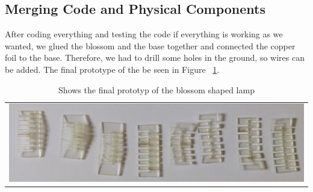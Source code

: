 \documentclass[00_doc.tex]{subfiles}
\begin{document}
    \subsection{Merging Code and Physical Components}
    \begin{flushleft}
        After coding everything and testing the code if everything is working as we wanted, we glued
        the blossom and the base together and connected the copper foil to the base. Therefore, we had 
        to drill some holes in the ground, so wires can be added. The final prototype of the be seen in 
        Figure ~\ref{fig:finalPrototyp}.
    \end{flushleft}

    \begin{table}[h!]
        \centering
        \begin{tabular}{c}
        \centering
        \includegraphics[width=.8\linewidth]{images/process/01_LaserCut.jpg}
        \end{tabular}
        \caption{Shows the final prototyp of the blossom shaped lamp}
        \label{fig:finalPrototyp}
    \end{table}
\end{document}
